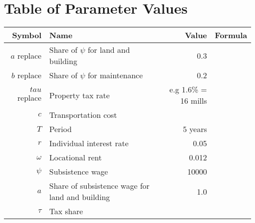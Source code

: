 \section{Table of Parameter Values}

\renewcommand{\arraystretch}{1.5}
\begin{tabular}{rlrr}
Symbol         & Name                                 & Value      & Formula  \\ \hline
$a$ replace    & Share of $\psi$ for land and building &   0.3         & \\
$b$ replace    & Share of $\psi$ for maintenance       &   0.2         & \\
$tau$ replace  & Property tax rate &  e.g 1.6\% = 16 mills             & \\
$c$       & Transportation cost & \\
$T$       & Period & 5 years      \\
$r$       & Individual interest rate & 0.05 \\
$\omega$  & Locational rent & 0.012  \\
$\psi$    & Subsistence wage & 10000 \\
$a$       & Share of subsistence wage for land and building & 1.0 \\
$\tau$       & Tax share & \\


\end{tabular}
